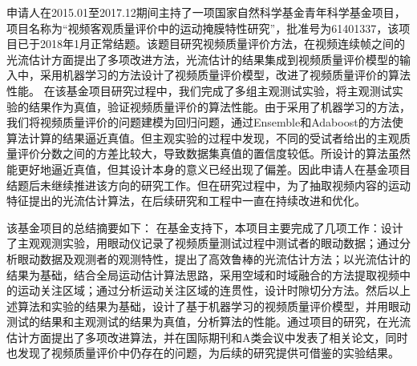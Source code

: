 \documentclass[12pt]{article}
\begin{document}
申请人在2015.01至2017.12期间主持了一项国家自然科学基金青年科学基金项目，项目名称为“视频客观质量评价中的运动掩膜特性研究”，批准号为61401337，该项目已于2018年1月正常结题。该题目研究视频质量评价方法，在视频连续帧之间的光流估计方面提出了多项改进方法，光流估计的结果集成到视频质量评价模型的输入中，采用机器学习的方法设计了视频质量评价模型，改进了视频质量评价的算法性能。
在该基金项目研究过程中，我们完成了多组主观测试实验，将主观测试实验的结果作为真值，验证视频质量评价的算法性能。由于采用了机器学习的方法，我们将视频质量评价的问题建模为回归问题，通过Ensemble和Adaboost的方法使算法计算的结果逼近真值。但主观实验的过程中发现，不同的受试者给出的主观质量评价分数之间的方差比较大，导致数据集真值的置信度较低。所设计的算法虽然能更好地逼近真值，但其设计本身的意义已经出现了偏差。因此申请人在基金项目结题后未继续推进该方向的研究工作。但在研究过程中，为了抽取视频内容的运动特征提出的光流估计算法，在后续研究和工程中一直在持续改进和优化。

该基金项目的总结摘要如下：
在基金支持下，本项目主要完成了几项工作：设计了主观观测实验，用眼动仪记录了视频质量测试过程中测试者的眼动数据；通过分析眼动数据及观测者的观测特性，提出了高效鲁棒的光流估计方法；以光流估计的结果为基础，结合全局运动估计算法思路，采用空域和时域融合的方法提取视频中的运动关注区域；通过分析运动关注区域的连贯性，设计时隙切分方法。然后以上述算法和实验的结果为基础，设计了基于机器学习的视频质量评价模型，并用眼动测试的结果和主观测试的结果为真值，分析算法的性能。通过项目的研究，在光流估计方面提出了多项改进算法，并在国际期刊和A类会议中发表了相关论文，同时也发现了视频质量评价中仍存在的问题，为后续的研究提供可借鉴的实验结果。
\end{document}
